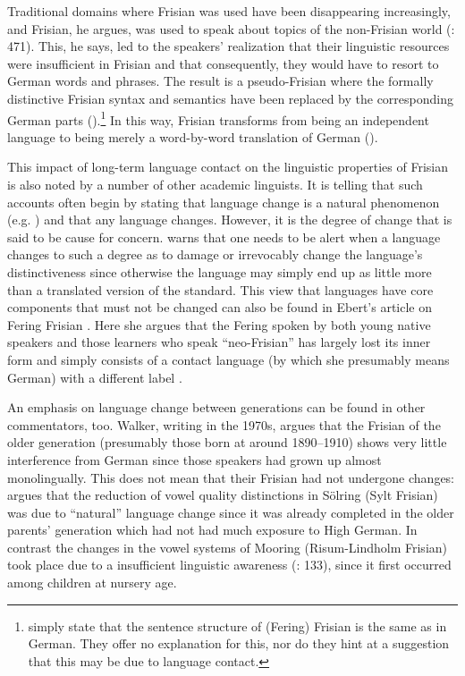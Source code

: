 \documentclass[output=paper]{langsci/langscibook}
\begin{document}
Traditional domains where Frisian was used have been disappearing increasingly, and Frisian, he argues, was used to speak about topics of the non-Frisian world (\citealt{Sjolin1997}: 471). This, he says, led to the speakers’ realization that their linguistic resources were insufficient in Frisian and that consequently, they would have to resort to German words and phrases. The result is a pseudo-Frisian where the formally distinctive Frisian syntax and semantics have been replaced by the corresponding German parts (\citealt{Sjolin1997}).\footnote{\citet[33]{SchmidtCraigie1928} simply state that the sentence structure of (Fering) Frisian is the same as in German. They offer no explanation for this, nor do they hint at a suggestion that this may be due to language contact.} In this way, Frisian transforms from being an independent language to being merely a word-by-word translation of German (\citealt{Ebert1994}). 

This impact of long-term language contact on the linguistic properties of Frisian is also noted by a number of other academic linguists. It is telling that such accounts often begin by stating that language change is a natural phenomenon (e.g. \citealt{Walker1979, Ebert1994}) and that any language changes. However, it is the degree of change that is said to be cause for concern. \citet[53]{Walker1979} warns that one needs to be alert when a language changes to such a degree as to damage or irrevocably change the language’s distinctiveness since otherwise the language may simply end up as little more than a translated version of the standard. This view that languages have core components that must not be changed can also be found in Ebert’s article on Fering Frisian \citep{Ebert1994}. Here she argues that the Fering spoken by both young native speakers and those learners who speak “neo-Frisian” has largely lost its inner form and simply consists of a contact language (by which she presumably means German) with a different label \citep[25]{Ebert1994}.\par An emphasis on language change between generations can be found in other commentators, too. Walker, writing in the 1970s, argues that the Frisian of the older generation (presumably those born at around 1890--1910) shows very little interference from German since those speakers had grown up almost monolingually. This does not mean that their Frisian had not undergone changes: \citet[113]{Walker1978} argues that the reduction of vowel quality distinctions in Sölring (Sylt Frisian) was due to “natural” language change since it was already completed in the older parents’ generation which had not had much exposure to High German. In contrast the changes in the vowel systems of Mooring (Risum-Lindholm Frisian) took place due to a insufficient linguistic awareness (\citealt{Walker1978}: 133), since it first occurred among children at nursery age. 
\end{document}

